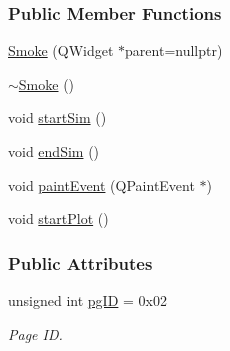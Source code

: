 \subsubsection*{Public Member Functions}
\begin{DoxyCompactItemize}
\item 
\mbox{\hyperlink{classSmoke_a37d4531eec55ecb9085bf7b1a6b03228}{Smoke}} (Q\+Widget $\ast$parent=nullptr)
\item 
\mbox{\hyperlink{classSmoke_a545ad6bf5610bf9bbe3e62967db1fff9}{$\sim$\+Smoke}} ()
\item 
void \mbox{\hyperlink{classSmoke_aca6f4c3a6e62bf27920229c5b53ae561}{start\+Sim}} ()
\item 
void \mbox{\hyperlink{classSmoke_a83d3a0d8bf172fcd6bc42ebf07f0f12f}{end\+Sim}} ()
\item 
void \mbox{\hyperlink{classSmoke_af00f430e6cbe30b6caf841d7d1b05890}{paint\+Event}} (Q\+Paint\+Event $\ast$)
\item 
void \mbox{\hyperlink{classSmoke_a989e6653d16bee5d83dc53e766a1eae7}{start\+Plot}} ()
\end{DoxyCompactItemize}
\subsubsection*{Public Attributes}
\begin{DoxyCompactItemize}
\item 
unsigned int \mbox{\hyperlink{classSmoke_a85ac4d6389daf0b33572436f18141397}{pg\+ID}} = 0x02
\begin{DoxyCompactList}\small\item\em Page ID. \end{DoxyCompactList}\end{DoxyCompactItemize}
